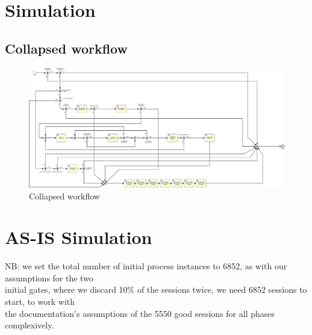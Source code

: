 \section{Simulation}
\label{sec:simulation}

\subsection{Collapsed workflow}

\begin{figure}[H]
\centering
\includegraphics[width=1\textwidth]{figures/Collapsed Workflow SIM.pdf}
\caption{Collapsed workflow}
\label{fig:collapsed_workflow}
\end{figure}

\section{AS-IS Simulation}
\label{sec:as_is_simulation}

NB: we set the total number of initial process instances to 6852,
as with our assumptions for the two \\ 
initial gates, where we discard 10\% of the sessions twice, we need 6852 sessions to start, to work with  \\ 
the documentation's assumptions of the 5550 good sessions for all phases complexively. \\

